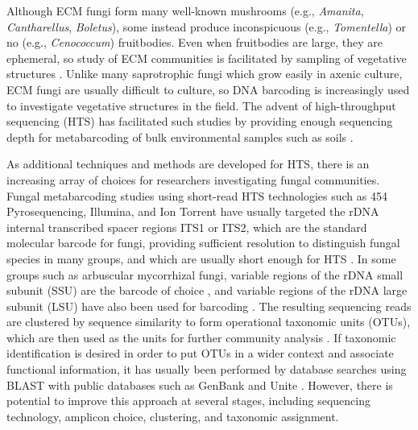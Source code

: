 \documentclass[
  12pt,
]{article}
\begin{document}
Although ECM fungi form many well-known mushrooms (e.g., \emph{Amanita}, \emph{Cantharellus}, \emph{Boletus}), some instead produce inconspicuous (e.g., \emph{Tomentella}) or no (e.g., \emph{Cenococcum}) fruitbodies.
Even when fruitbodies are large, they are ephemeral, so study of ECM communities is facilitated by sampling of vegetative structures \autocite{horton2001}.
Unlike many saprotrophic fungi which grow easily in axenic culture, ECM fungi are usually difficult to culture, so DNA barcoding is increasingly used to investigate vegetative structures in the field.
The advent of high-throughput sequencing (HTS) has facilitated such studies by providing enough sequencing depth for metabarcoding of bulk environmental samples such as soils \autocite{Lindahl2013}.

As additional techniques and methods are developed for HTS, there is an increasing array of choices for researchers investigating fungal communities.
Fungal metabarcoding studies using short-read HTS technologies such as 454 Pyrosequencing, Illumina, and Ion Torrent
have usually targeted the rDNA internal transcribed spacer regions ITS1 or ITS2,
which are the standard molecular barcode for fungi, providing sufficient resolution to distinguish fungal species in many groups, and which are usually short enough for HTS \autocite{schoch2012,Lindahl2013}.
In some groups such as arbuscular mycorrhizal fungi, variable regions of the rDNA small subunit (SSU) are the barcode of choice \autocite{opik2010}, and variable regions of the rDNA large subunit (LSU) have also been used for barcoding \autocites[e.g.,][]{kurtzman1998,tedersoo2015,house2016}.
The resulting sequencing reads are clustered by sequence similarity to form operational taxonomic units (OTUs), which are then used as the units for further community analysis \autocite{Lindahl2013}.
If taxonomic identification is desired in order to put OTUs in a wider context and associate functional information, it has usually been performed by database searches using BLAST \autocite{altschul1990,Lindahl2013} with public databases such as GenBank \autocite{benson2013} and Unite \autocite{nilsson2019a}.
However, there is potential to improve this approach at several stages, including sequencing technology, amplicon choice, clustering, and taxonomic assignment.
\end{document}
